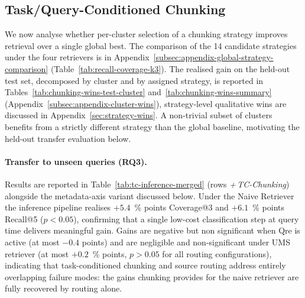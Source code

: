 \subsection{Task/Query-Conditioned Chunking}
\label{sec:indexing-results}

We now analyse whether per-cluster selection of a chunking strategy improves
retrieval over a single global best. The comparison of the 14 candidate
strategies under the four retrievers is in Appendix~\ref{subsec:appendix-global-strategy-comparison}
(Table~\ref{tab:recall-coverage-k3}).
The realised gain on the held-out test set, decomposed by cluster and by
assigned strategy, is reported in
Tables~\ref{tab:chunking-wins-test-cluster} and~\ref{tab:chunking-wins-summary}
(Appendix~\ref{subsec:appendix-cluster-wins}), strategy-level qualitative wins are discussed in
Appendix~\ref{sec:strategy-wins}. A non-trivial subset of clusters
benefits from a strictly different strategy than the global baseline,
motivating the held-out transfer evaluation below.

\paragraph{Transfer to unseen queries (RQ3).}
Results are reported in Table~\ref{tab:tc-inference-merged} (rows
\textit{+\,TC-Chunking}) alongside the metadata-axis variant
discussed below. Under the Naive Retriever the inference pipeline realises
$+5.4$~\% points Coverage@3 and $+6.1$~\% points Recall@5 ($p<0.05$), confirming
that a single low-cost classification step at query time delivers
meaningful gain. Gains are negative but non significant when Qre is active (at most $-0.4$ points) and are negligible and non-significant under UMS retriever (at most $+0.2$~\% points, $p>0.05$ for all routing
configurations), indicating that task-conditioned chunking and source
routing address entirely overlapping failure modes: the gains chunking
provides for the naive retriever are fully recovered by routing alone.

